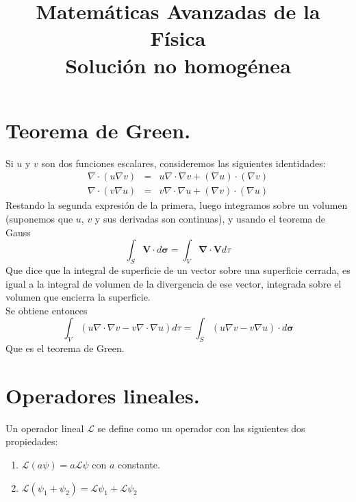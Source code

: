 
\title{Matemáticas Avanzadas de la Física \\ {\large Solución no homogénea}}
\date{ }

\renewcommand\labelenumii{\theenumi.{\arabic{enumii}}}
\maketitle
\fontsize{14}{14}\selectfont
\section{Teorema de Green.}
Si $u$ y $v$ son dos funciones escalares, consideremos las siguientes identidades:
\begin{eqnarray}
\nabla \cdot ( u \nabla v) &=& u \nabla \cdot \nabla v + (\nabla u) \cdot (\nabla v) \\
\nabla \cdot ( v \nabla u) &=& v \nabla \cdot \nabla u + (\nabla v) \cdot (\nabla u)
\end{eqnarray}
Restando la segunda expresión de la primera, luego integramos sobre un volumen (suponemos que $u$, $v$ y sus derivadas son continuas), y usando el teorema de Gauss
\begin{equation}
\int_{S} \mathbf{V} \cdot d \bm{\sigma} = \int_{V} \mathbf{\nabla} \cdot \mathbf{V} d \tau
\end{equation}
Que dice que la integral de superficie de un vector sobre una superficie cerrada, es igual a la integral de volumen de la divergencia de ese vector, integrada sobre el volumen que encierra la superficie.
\\
Se obtiene entonces
\begin{equation}
\int_{V} (u \nabla \cdot \nabla v - v \nabla \cdot \nabla u) d \tau = \int_{S} (u \nabla v - v \nabla u) \cdot d \bm{\sigma}
\end{equation}
Que es el teorema de Green.
\section{Operadores lineales.}
Un operador lineal $\mathcal{L}$ se define como un operador con las siguientes dos propiedades:
\begin{enumerate}
\item $\mathcal{L}(a \psi) = a \mathcal{L} \psi$ con $a$ constante.
\item $\mathcal{L} (\psi_{1} + \psi_{2}) =  \mathcal{L} \psi_{1} + \mathcal{L} \psi_{2}$
\end{enumerate}
